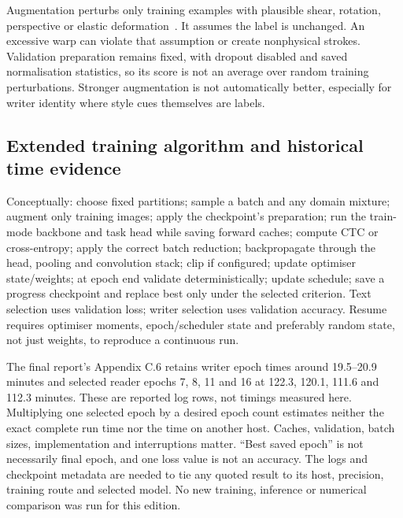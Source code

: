 Augmentation perturbs only training examples with plausible shear, rotation,
perspective or elastic deformation~\cite{simard2003}. It assumes the label
is unchanged. An excessive warp can violate that assumption or create
nonphysical strokes. Validation preparation remains fixed, with dropout
disabled and saved normalisation statistics, so its score is not an average
over random training perturbations. Stronger augmentation is not automatically
better, especially for writer identity where style cues themselves are labels.

\subsection{Extended training algorithm and historical time evidence}
Conceptually: choose fixed partitions; sample a batch and any domain mixture;
augment only training images; apply the checkpoint's preparation; run the
train-mode backbone and task head while saving forward caches; compute CTC
or cross-entropy; apply the correct batch reduction; backpropagate through
the head, pooling and convolution stack; clip if configured; update optimiser
state/weights; at epoch end validate deterministically; update schedule;
save a progress checkpoint and replace best only under the selected criterion.
Text selection uses validation loss; writer selection uses validation accuracy.
Resume requires optimiser moments, epoch/scheduler state and preferably
random state, not just weights, to reproduce a continuous run.

The final report's Appendix C.6 retains writer epoch times around 19.5--20.9
minutes and selected reader epochs 7, 8, 11 and 16 at 122.3, 120.1, 111.6
and 112.3 minutes. These are reported log rows, not timings measured here.
Multiplying one selected epoch by a desired epoch count estimates neither
the exact complete run time nor the time on another host. Caches, validation,
batch sizes, implementation and interruptions matter. ``Best saved epoch''
is not necessarily final epoch, and one loss value is not an accuracy.
The logs and checkpoint metadata are needed to tie any quoted result to
its host, precision, training route and selected model. No new training,
inference or numerical comparison was run for this edition.
